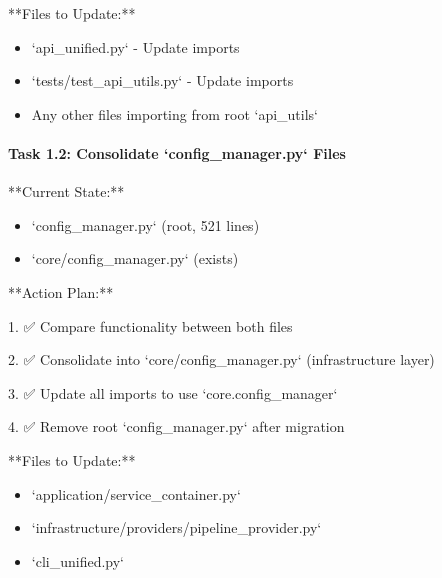 \documentclass[11pt,a4paper]{article}
\begin{document}
**Files to Update:**

\begin{itemize}
\item `api_unified.py` - Update imports
\end{itemize}

\begin{itemize}
\item `tests/test_api_utils.py` - Update imports
\end{itemize}

\begin{itemize}
\item Any other files importing from root `api_utils`
\end{itemize}

\paragraph{Task 1.2: Consolidate `config_manager.py` Files}

**Current State:**

\begin{itemize}
\item `config_manager.py` (root, 521 lines)
\end{itemize}

\begin{itemize}
\item `core/config_manager.py` (exists)
\end{itemize}

**Action Plan:**

1. ✅ Compare functionality between both files

2. ✅ Consolidate into `core/config\_manager.py` (infrastructure layer)

3. ✅ Update all imports to use `core.config\_manager`

4. ✅ Remove root `config\_manager.py` after migration

**Files to Update:**

\begin{itemize}
\item `application/service_container.py`
\end{itemize}

\begin{itemize}
\item `infrastructure/providers/pipeline_provider.py`
\end{itemize}

\begin{itemize}
\item `cli_unified.py`
\end{itemize}
\end{document}
